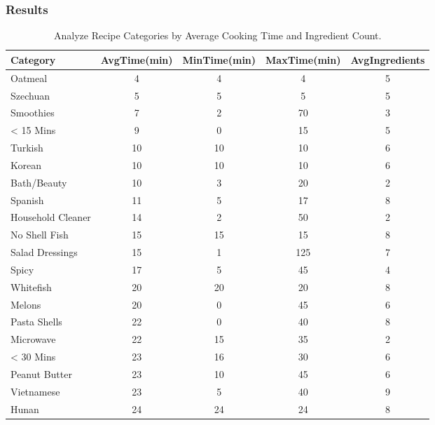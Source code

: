 \begin{enumerate}
    \subsubsection{Results}
\begin{table}[h!]
\small %
\centering
\begin{tabularx}{\textwidth}{lcccc}
\toprule
\textbf{Category} & \textbf{AvgTime(min)} & \textbf{MinTime(min)} & \textbf{MaxTime(min)} & \textbf{AvgIngredients} \\
\midrule
Oatmeal            & 4  & 4   & 4   & 5 \\
Szechuan           & 5  & 5   & 5   & 5 \\
Smoothies          & 7  & 2   & 70  & 3 \\
< 15 Mins          & 9  & 0   & 15  & 5 \\
Turkish            & 10 & 10  & 10  & 6 \\
Korean             & 10 & 10  & 10  & 6 \\
Bath/Beauty        & 10 & 3   & 20  & 2 \\
Spanish            & 11 & 5   & 17  & 8 \\
Household Cleaner  & 14 & 2   & 50  & 2 \\
No Shell Fish      & 15 & 15  & 15  & 8 \\
Salad Dressings    & 15 & 1   & 125 & 7 \\
Spicy              & 17 & 5   & 45  & 4 \\
Whitefish          & 20 & 20  & 20  & 8 \\
Melons             & 20 & 0   & 45  & 6 \\
Pasta Shells       & 22 & 0   & 40  & 8 \\
Microwave          & 22 & 15  & 35  & 2 \\
< 30 Mins          & 23 & 16  & 30  & 6 \\
Peanut Butter      & 23 & 10  & 45  & 6 \\
Vietnamese         & 23 & 5   & 40  & 9 \\
Hunan              & 24 & 24  & 24  & 8 \\
\bottomrule
\end{tabularx}
\caption{Analyze Recipe Categories by Average Cooking Time and Ingredient Count.}
\label{tab:category_data}
\end{table}


\end{enumerate}
